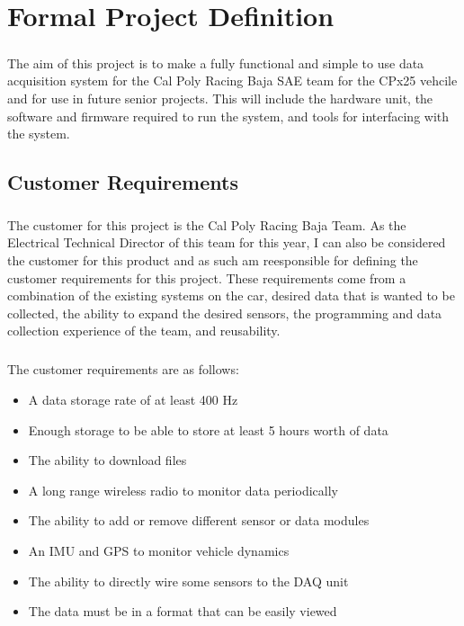 \chapter{Formal Project Definition}

\paragraph{}
The aim of this project is to make a fully functional and simple to use data acquisition system for the Cal Poly Racing Baja SAE team for the CPx25 vehcile and for use in future senior projects.
This will include the hardware unit, the software and firmware required to run the system, and tools for interfacing with the system.

\section{Customer Requirements}

\paragraph{}
The customer for this project is the Cal Poly Racing Baja Team.
As the Electrical Technical Director of this team for this year, I can also be considered the customer for this product and as such am reesponsible for defining the customer requirements for this project.
These requirements come from a combination of the existing systems on the car, desired data that is wanted to be collected, the ability to expand the desired sensors, the programming and data collection experience of the team, and reusability.

\paragraph{}
The customer requirements are as follows:
\begin{itemize}
	\item A data storage rate of at least 400 Hz
	\item Enough storage to be able to store at least 5 hours worth of data
	\item The ability to download files
	\item A long range wireless radio to monitor data periodically
	\item The ability to add or remove different sensor or data modules
	\item An IMU and GPS to monitor vehicle dynamics
	\item The ability to directly wire some sensors to the DAQ unit
	\item The data must be in a format that can be easily viewed
\end{itemize}

